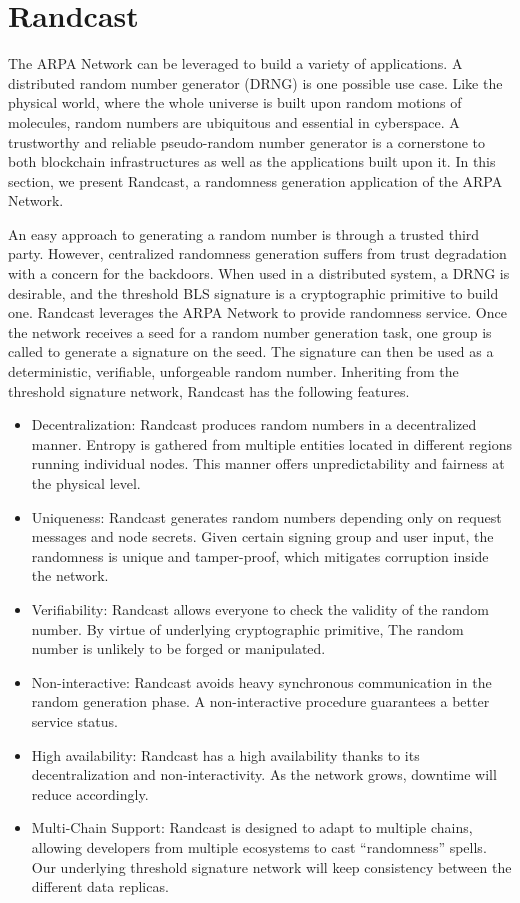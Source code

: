 \documentclass[11pt]{article}
\begin{document}
\section{Randcast}

The ARPA Network can be leveraged to build a variety of applications. A distributed random number generator (DRNG) is one possible use case. Like the physical world, where the whole universe is built upon random motions of molecules, random numbers are ubiquitous and essential in cyberspace. A trustworthy and reliable pseudo-random number generator is a cornerstone to both blockchain infrastructures as well as the applications built upon it. In this section, we present Randcast, a randomness generation application of the ARPA Network.

An easy approach to generating a random number is through a trusted third party. However, centralized randomness generation suffers from trust degradation with a concern for the backdoors. When used in a distributed system, a DRNG is desirable, and the threshold BLS signature is a cryptographic primitive to build one. Randcast leverages the ARPA Network to provide randomness service. Once the network receives a seed for a random number generation task, one group is called to generate a signature on the seed. The signature can then be used as a deterministic, verifiable, unforgeable random number. Inheriting from the threshold signature network, Randcast has the following features.

\begin{itemize}
    \item Decentralization: Randcast produces random numbers in a decentralized manner. Entropy is gathered from multiple entities located in different regions running individual nodes. This manner offers unpredictability and fairness at the physical level.
    \item Uniqueness: Randcast generates random numbers depending only on request messages and node secrets. Given certain signing group and user input, the randomness is unique and tamper-proof, which mitigates corruption inside the network.
    \item Verifiability: Randcast allows everyone to check the validity of the random number. By virtue of underlying cryptographic primitive, The random number is unlikely to be forged or manipulated.
    \item Non-interactive: Randcast avoids heavy synchronous communication in the random generation phase. A non-interactive procedure guarantees a better service status.
    \item High availability: Randcast has a high availability thanks to its decentralization and non-interactivity. As the network grows, downtime will reduce accordingly.
    \item Multi-Chain Support: Randcast is designed to adapt to multiple chains, allowing developers from multiple ecosystems to cast “randomness” spells. Our underlying threshold signature network will keep consistency between the different data replicas.
\end{itemize}
\end{document}

